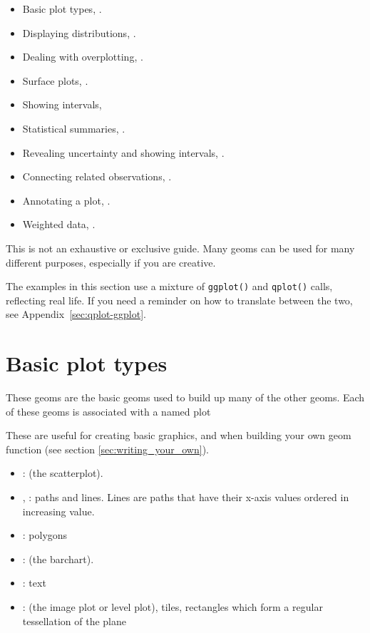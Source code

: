 \begin{itemize}
  \item Basic plot types, .
  \item Displaying distributions, .
  \item Dealing with overplotting, .
  \item Surface plots, .
  \item Showing intervals, 
  \item Statistical summaries, .
  \item Revealing uncertainty and showing intervals, .
  \item Connecting related observations, .
  \item Annotating a plot, .
  \item Weighted data, .
\end{itemize}

This is not an exhaustive or exclusive guide.  Many geoms can be used for many different purposes, especially if you are creative.

The examples in this section use a mixture of {\tt ggplot()} and {\tt qplot()} calls, reflecting real life.  If you need a reminder on how to translate between the two, see Appendix~\ref{sec:qplot-ggplot}.

\section{Basic plot types}\label{sec:basics}

These geoms are the basic geoms used to build up many of the other geoms.  Each of these geoms is associated with a named plot

These are useful for creating basic graphics, and when building your own geom function (see section \ref{sec:writing_your_own}).

\begin{itemize}
  \item {}: (the scatterplot).  
  \item {}, : paths and lines.  Lines are paths that have their x-axis values ordered in increasing value.
  \item {}: polygons
  \item {}: (the barchart).
  \item {}: text
  \item {}: (the image plot or level plot), tiles, rectangles which form a regular tessellation of the plane
\end{itemize}

